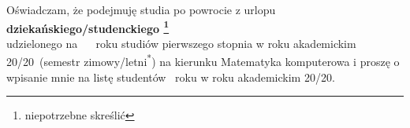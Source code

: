 \documentclass{wmiisubmission}
\begin{document}
\cracowdate
{}
\studentaddress
\addressee{\piotrniemiec}

\vskip 3.0cm


\vskip 0.5cm

Oświadczam, że podejmuję studia po powrocie z urlopu \textbf{dziekańskiego/studenckiego
\footnote[1]{niepotrzebne skreślić}}\\ udzielonego na ~\fillField{3cm}~ roku
studiów pierwszego stopnia w roku akademickim \\
20\fillField{0.7cm}/20\fillField{0.7cm}~(semestr zimowy/letni\textsuperscript{*})
na kierunku Matematyka komputerowa i proszę o wpisanie mnie na listę studentów
\fillField{3cm}~roku w roku akademickim 20\fillField{0.7cm}/20\fillField{0.7cm}.

\vskip 2.0cm

\studentsignature
\end{document}
